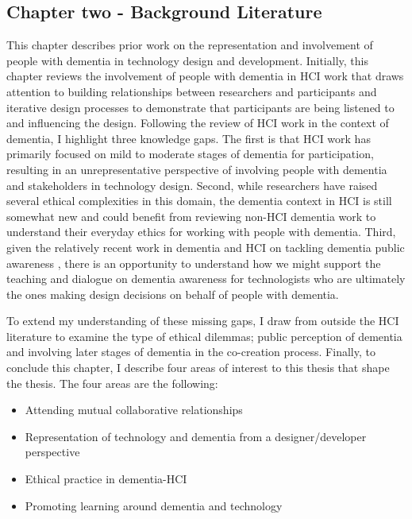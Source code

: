\subsection{Chapter two - Background Literature}
\label{Intro:ChapterTwo}
This chapter describes prior work on the representation and involvement of people with dementia in technology design and development. Initially, this chapter reviews the involvement of people with dementia in HCI work that draws attention to building relationships between researchers and participants and iterative design processes to demonstrate that participants are being listened to and influencing the design. Following the review of HCI work in the context of dementia, I highlight three knowledge gaps. The first is that HCI work has primarily focused on mild to moderate stages of dementia for participation, resulting in an unrepresentative perspective of involving people with dementia and stakeholders in technology design. Second, while researchers have raised several ethical complexities in this domain, the dementia context in HCI is still somewhat new and could benefit from reviewing non-HCI dementia work to understand their everyday ethics for working with people with dementia. Third, given the relatively recent work in dementia and HCI on tackling dementia public awareness \citep{lazar_safe_2019,talbot_how_2020}, there is an opportunity to understand how we might support the teaching and dialogue on dementia awareness for technologists who are ultimately the ones making design decisions on behalf of people with dementia.  

To extend my understanding of these missing gaps, I draw from outside the HCI literature to examine the type of ethical dilemmas; public perception of dementia and involving later stages of dementia in the co-creation process. Finally, to conclude this chapter, I describe four areas of interest to this thesis that shape the thesis. The four areas are the following: 
\begin{itemize}
    \item Attending mutual collaborative relationships
    \item Representation of technology and dementia from a designer/developer perspective
    \item Ethical practice in dementia-HCI
    \item Promoting learning around dementia and technology
\end{itemize}

